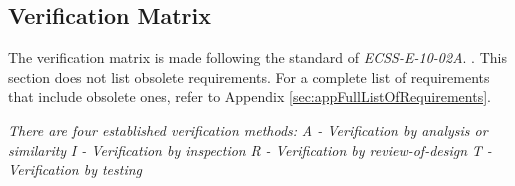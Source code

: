 \subsection{Verification Matrix}

The verification matrix is made following the standard of \textit{ECSS-E-10-02A}. \cite{ECSSSecretariat}. This section does not list obsolete requirements. For a complete list of requirements that include obsolete ones, refer to Appendix \ref{sec:appFullListOfRequirements}.

\textit{There are four established verification methods:}
\newline \textit{A - Verification by analysis or similarity}
\newline \textit{I - Verification by inspection}
\newline \textit{R - Verification by review-of-design}
\newline \textit{T - Verification by testing}

